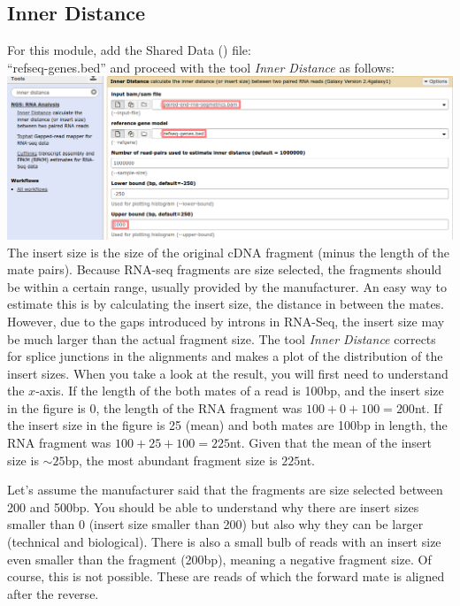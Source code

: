 \subsection{Inner Distance}
For this module, add the Shared Data (\textit{\datalibrarydirrnaseqadvanced}) file:\\
``refseq-genes.bed'' and proceed with the tool \textit{Inner Distance} as follows:\\
\includegraphics[width=\textwidth]{figures/qc2_02.png}\\
The insert size is the size of the original cDNA fragment (minus the length of the mate pairs).
Because RNA-seq fragments are size selected, the fragments should be within a certain range, usually provided by the manufacturer.
An easy way to estimate this is by calculating the insert size, the distance in between the mates.
However, due to the gaps introduced by introns in RNA-Seq, the insert size may be much larger than the actual fragment size.
The tool \textit{Inner Distance} corrects for splice junctions in the alignments and makes a plot of the distribution of the insert sizes.
When you take a look at the result, you will first need to understand the $x$-axis.
If the length of the both mates of a read is 100bp, and the insert size in the figure is 0, the length of the RNA fragment was $100+0+100=200$nt.
If the insert size in the figure is 25 (mean) and both mates are 100bp in length, the RNA fragment was $100+25+100=225$nt.
Given that the mean of the insert size is $\sim25$bp, the most abundant fragment size is $225$nt.

Let's assume the manufacturer said that the fragments are size selected between 200 and 500bp.
You should be able to understand why there are insert sizes smaller than 0 (insert size smaller than 200) but also why they can be larger (technical and biological).
There is also a small bulb of reads with an insert size even smaller than the fragment (200bp), meaning a negative fragment size.
Of course, this is not possible.
These are reads of which the forward mate is aligned after the reverse.


